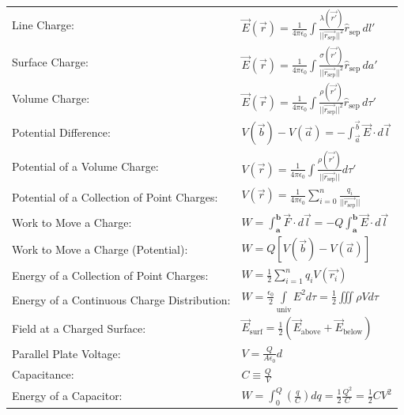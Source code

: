 \documentclass{article}
\newcommand{\sepvec}{\vec{r_\textrm{sep}}}
\newcommand{\sephat}{\hat{r}_{\textrm{sep}}}
\newcommand{\kfrac}{\frac{1}{4\pi\epsilon_0}}
\newcommand{\bfrac}[2]{\left(\frac{#1}{#2}\right)}
\newcommand{\formbox}[2]{\begin{center} \begin{tcolorbox}[colback=white, title = #1, boxrule=2pt,arc=3.4pt,boxsep=0mm] #2\end{tcolorbox}\end{center}}
\begin{document}
\begin{multicols*}{2}
    \formbox{Electrostatics Basics}{
        {\renewcommand{\arraystretch}{1.75}%
        \begin{tabular}{ m{12em} m{25em}  }
            Line Charge: & $\displaystyle \vec{E}(\vec{r}) = \frac{1}{4 \pi \epsilon_0}\int{\frac{\lambda(\vec{r'})}{||\sepvec||^2}\sephat \, dl'}$\\
            Surface Charge: & $\displaystyle \vec{E}(\vec{r}) = \frac{1}{4\pi\epsilon_0}\int{\frac{\sigma(\vec{r'})}{||\sepvec||^2}\sephat \, da'}$\\
            Volume Charge: & $\displaystyle \vec{E}(\vec{r}) = \frac{1}{4\pi\epsilon_0}\int{\frac{\rho(\vec{r'})}{||\sepvec||^2}\sephat \, d\tau'}$\\
            Potential Difference: & $\displaystyle V(\vec{b}) - V(\vec{a}) = - \int_{\vec{a}}^{\vec{b}}{\vec{E} \cdot d\vec{l}}$\\
            Potential of a Volume Charge: & $\displaystyle V(\vec{r}) = \kfrac \int{\frac{\rho(\vec{r'})}{||\sepvec||}d\tau'}
            $\\
            Potential of a Collection of Point Charges: & $\displaystyle V(\vec{r}) = \kfrac \sum_{i = 0}^n\frac{q_i}{||\sepvec||}$\\
            Work to Move a Charge: & $\displaystyle {W = \int_{\textbf{a}}^{\textbf{b}} \vec{F} \cdot d\vec{l} = -Q\int_{\textbf{a}}^{\textbf{b}}{\vec{E} \cdot d\vec{l}}}$\\
            Work to Move a Charge (Potential): & $\displaystyle {W= Q[V(\vec{b}) - V(\vec{a})]}$\\
            Energy of a Collection of Point Charges: & $\displaystyle W = \frac{1}{2}\sum_{i = 1}^n{q_i V(\vec{r_i})}$\\
            Energy of a Continuous Charge Distribution: & $\displaystyle W = \frac{\epsilon_0}{2}\int\limits_{\textrm{univ}}E^2 d\tau = \frac{1}{2}\iiint \rho V d\tau$\\
            Field at a Charged Surface: & $\displaystyle \vec{E}_\textrm{surf} = \frac{1}{2} \left( \vec{E}_\textrm{above} + \vec{E}_\textrm{below}\right)$\\
            Parallel Plate Voltage: & $\displaystyle V = \frac{Q}{A\epsilon_0}d$\\
            Capacitance: & $\displaystyle C \equiv \frac{Q}{V}$\\
            Energy of a Capacitor: & $\displaystyle W = \int_0^Q{\bfrac{q}{C}dq} = \frac{1}{2}\frac{Q^2}{C} = \frac{1}{2} CV^2$\\


\end{tabular}}}
\end{multicols*}
\end{document}

